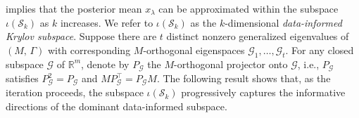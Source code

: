 \documentclass[]{myarticle}
\begin{document}
 implies that the posterior mean $x_{\lambda}$ can be approximated within the subspace $\iota(\mathcal S_k)$ as $k$ increases. We refer to $\iota(\mathcal{S}_k)$ as the $k$-dimensional \emph{data-informed Krylov subspace}. Suppose there are $t$ distinct nonzero generalized eigenvalues of $(M,\,\Gamma)$ with corresponding $M$-orthogonal eigenspaces $\mathcal{G}_1,\dots,\mathcal{G}_{t}$. For any closed subspace $\mathcal{G}$ of $\mathbb{R}^{m}$, denote by $P_{\mathcal{G}}$ the $M$-orthogonal projector onto $\mathcal{G}$, i.e., $P_{\mathcal{G}}$ satisfies $P_{\mathcal{G}}^2=P_{\mathcal{G}}$ and $MP_{\mathcal{G}}^{\top}=P_{\mathcal{G}}M$. The following result shows that, as the iteration proceeds, the subspace $\iota(\mathcal{S}_k)$ progressively captures the informative directions of the dominant data-informed subspace.
\end{document}
